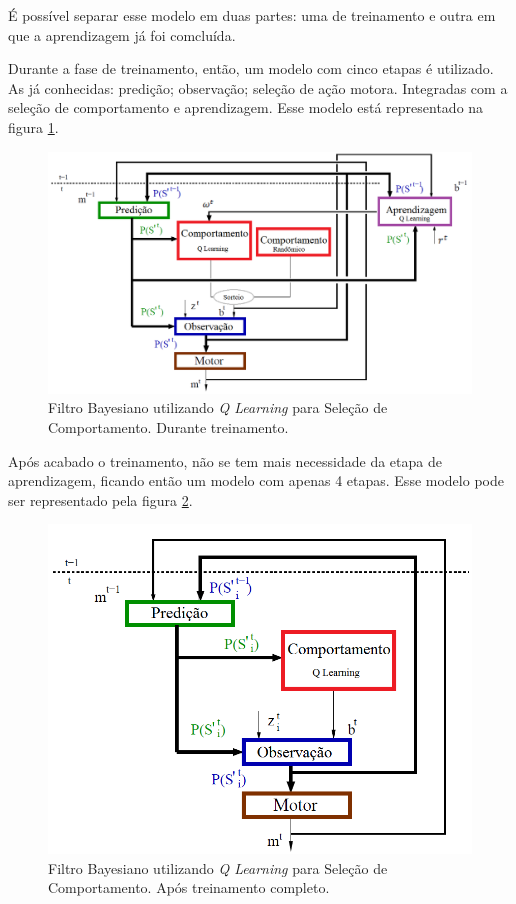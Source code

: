 É possível separar esse modelo em duas partes: uma de treinamento e outra em que a aprendizagem já foi comcluída.

Durante a fase de treinamento, então, um modelo com cinco etapas é utilizado. As já conhecidas: predição; observação; seleção de ação motora. Integradas com a seleção de comportamento e aprendizagem. Esse modelo está representado na figura \ref{img:ModeloFinalTreinamento}.

\begin{figure}[H]
    \centering
    \includegraphics[width=150mm]{images/modelo_bayesiano_treino-tiago}
    \caption{Filtro Bayesiano utilizando \textit{Q Learning} para Seleção de Comportamento. Durante treinamento.}
    \label{img:ModeloFinalTreinamento}
\end{figure}

Após acabado o treinamento, não se tem mais necessidade da etapa de aprendizagem, ficando então um modelo com apenas 4 etapas. Esse modelo pode ser representado pela figura \ref{img:ModeloFinalPosTreinamento}.

\begin{figure}[h!]
    \centering
    \includegraphics[width=120mm]{images/modelo_bayesiano_final-tiago}
    \caption{Filtro Bayesiano utilizando \textit{Q Learning} para Seleção de Comportamento. Após treinamento completo.}
    \label{img:ModeloFinalPosTreinamento}
\end{figure}

